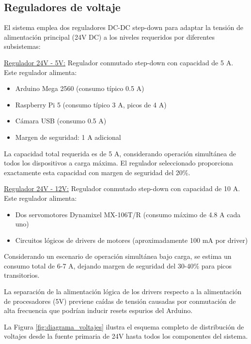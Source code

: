 \subsection{Reguladores de voltaje}

El sistema emplea dos reguladores DC-DC step-down para adaptar la tensión de alimentación principal (24V DC) a los niveles requeridos por diferentes subsistemas:

\underline{Regulador 24V - 5V:} Regulador conmutado step-down con capacidad de 5 A. Este regulador alimenta:
\begin{itemize}[label=$\bullet$]
\item Arduino Mega 2560 (consumo típico 0.5 A)
\item Raspberry Pi 5 (consumo típico 3 A, picos de 4 A)
\item Cámara USB (consumo 0.5 A)
\item Margen de seguridad: 1 A adicional
\end{itemize}

La capacidad total requerida es de 5 A, considerando operación simultánea de todos los dispositivos a carga máxima. El regulador seleccionado proporciona exactamente esta capacidad con margen de seguridad del 20\%.

\underline{Regulador 24V - 12V:} Regulador conmutado step-down con capacidad de 10 A. Este regulador alimenta:
\begin{itemize}[label=$\bullet$]
    \item Dos servomotores Dynamixel MX-106T/R (consumo máximo de 4.8 A cada uno)
    \item Circuitos lógicos de drivers de motores (aproximadamente 100 mA por driver)
\end{itemize} 
Considerando un escenario de operación simultánea bajo carga, se estima un consumo total de 6-7 A, dejando margen de seguridad del 30-40\% para picos transitorios.

La separación de la alimentación lógica de los drivers respecto a la alimentación de procesadores (5V) previene caídas de tensión causadas por conmutación de alta frecuencia que podrían inducir resets espurios del Arduino.

La Figura \ref{fig:diagrama_voltajes} ilustra el esquema completo de distribución de voltajes desde la fuente primaria de 24V hasta todos los componentes del sistema.

